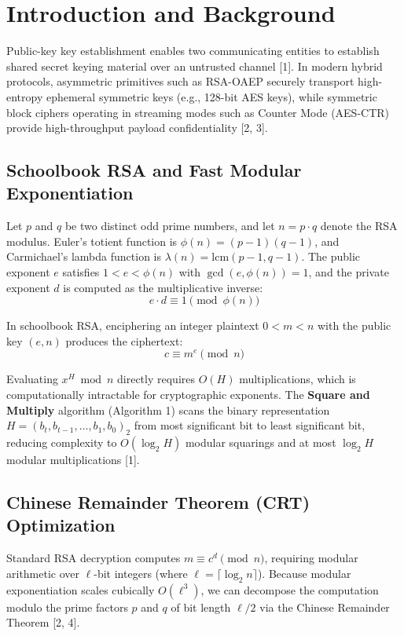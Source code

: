 \documentclass[10pt,twocolumn,letterpaper]{article}
\begin{document}
\section{Introduction and Background}

Public-key key establishment enables two communicating entities to establish shared secret keying material over an untrusted channel [1]. In modern hybrid protocols, asymmetric primitives such as RSA-OAEP securely transport high-entropy ephemeral symmetric keys (e.g., 128-bit AES keys), while symmetric block ciphers operating in streaming modes such as Counter Mode (AES-CTR) provide high-throughput payload confidentiality [2, 3].

\subsection{Schoolbook RSA and Fast Modular Exponentiation}

Let $p$ and $q$ be two distinct odd prime numbers, and let $n = p \cdot q$ denote the RSA modulus. Euler's totient function is $\phi(n) = (p-1)(q-1)$, and Carmichael's lambda function is $\lambda(n) = \text{lcm}(p-1, q-1)$. The public exponent $e$ satisfies $1 < e < \phi(n)$ with $\gcd(e, \phi(n)) = 1$, and the private exponent $d$ is computed as the multiplicative inverse:
\begin{equation}
    e \cdot d \equiv 1 \pmod{\phi(n)}
\end{equation}

In schoolbook RSA, enciphering an integer plaintext $0 < m < n$ with the public key $(e, n)$ produces the ciphertext:
\begin{equation}
    c \equiv m^e \pmod{n}
\end{equation}

Evaluating $x^H \bmod n$ directly requires $O(H)$ multiplications, which is computationally intractable for cryptographic exponents. The \textbf{Square and Multiply} algorithm (Algorithm 1) scans the binary representation $H = (b_t, b_{t-1}, \dots, b_1, b_0)_2$ from most significant bit to least significant bit, reducing complexity to $O(\log_2 H)$ modular squarings and at most $\log_2 H$ modular multiplications [1].

\subsection{Chinese Remainder Theorem (CRT) Optimization}

Standard RSA decryption computes $m \equiv c^d \pmod n$, requiring modular arithmetic over $\ell$-bit integers (where $\ell = \lceil \log_2 n \rceil$). Because modular exponentiation scales cubically $O(\ell^3)$, we can decompose the computation modulo the prime factors $p$ and $q$ of bit length $\ell/2$ via the Chinese Remainder Theorem [2, 4].
\end{document}
